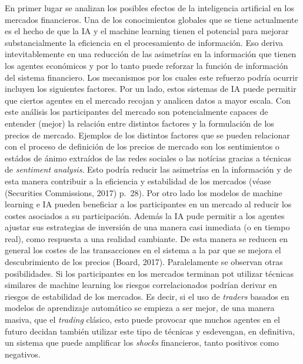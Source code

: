\documentclass[]{DissertateUSU}
\begin{document}
\noindent En primer lugar se analizan los posibles efectos de la
inteligencia artificial en los mercados financieros. Una de los
conocimientos globales que se tiene actualmente es el hecho de que la IA
y el machine learning tienen el potencial para mejorar substancialmente
la eficiencia en el procesamiento de información. Eso deriva
intevitablemente en una reducción de las asimetrías en la información
que tienen los agentes económicos y por lo tanto puede reforzar la
función de información del sistema financiero. Los mecanismos por los
cuales este refuerzo podría ocurrir incluyen los siguientes factores.
Por un lado, estos sistemas de IA puede permitir que ciertos agentes en
el mercado recojan y analicen datos a mayor escala. Con este análisis
los participantes del mercado son potencialmente capaces de entender
(mejor) la relación entre distintos factores y la formulación de los
precios de mercado. Ejemplos de los distintos factores que se pueden
relacionar con el proceso de definición de los precios de mercado son
los sentimientos o estádos de ánimo extraídos de las redes sociales o
las notícias gracias a técnicas de \emph{sentiment analysis}. Esto
podría reducir las asimetrías en la información y de esta manera
contribuir a la eficiencia y estabilidad de los mercados (véase
(Securities Commissions, 2017) p.~28). Por otro lado los modelos de
machine learning e IA pueden beneficiar a los participantes en un
mercado al reducir los costes asociados a su participación. Además la IA
pude permitir a los agentes ajustar sus estrategias de inversión de una
manera casi inmediata (o en tiempo real), como respuesta a una realidad
cambiante. De esta manera se reducen en general los costes de las
transacciones en el sistema a la par que se mejora el descubrimiento de
los precios (Board, 2017). Paralelamente se observan otras
posibilidades. Si los participantes en los mercados terminan pot
utilizar técnicas similares de machine learning los riesgos
correlacionados podrían derivar en riesgos de estabilidad de los
mercados. Es decir, si el uso de \emph{traders} basados en modelos de
aprendizaje automático se empieza a ser mejor, de una manera masiva, que
el \emph{trading} clásico, esto puede provocar que muchos agentes en el
futuro decidan también utilizar este tipo de técnicas y esdevengan, en
definitiva, un sistema que puede amplificar los \emph{shocks}
financieros, tanto positivos como negativos.
\end{document}
